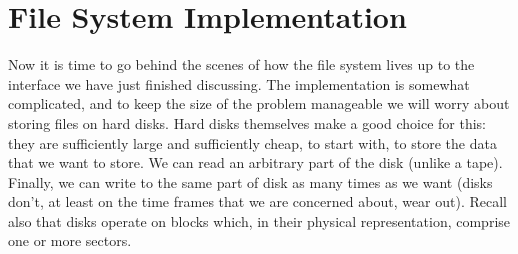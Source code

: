 




\section*{File System Implementation}
Now it is time to go behind the scenes of how the file system lives up to the interface we have just finished discussing. The implementation is somewhat complicated, and to keep the size of the problem manageable we will worry about storing files on hard disks. Hard disks themselves make a good choice for this: they are sufficiently large and sufficiently cheap, to start with, to store the data that we want to store. We can read an arbitrary part of the disk (unlike a tape). Finally, we can write to the same part of disk as many times as we want (disks don't, at least on the time frames that we are concerned about, wear out). Recall also that disks operate on blocks which, in their physical representation, comprise one or more sectors.






